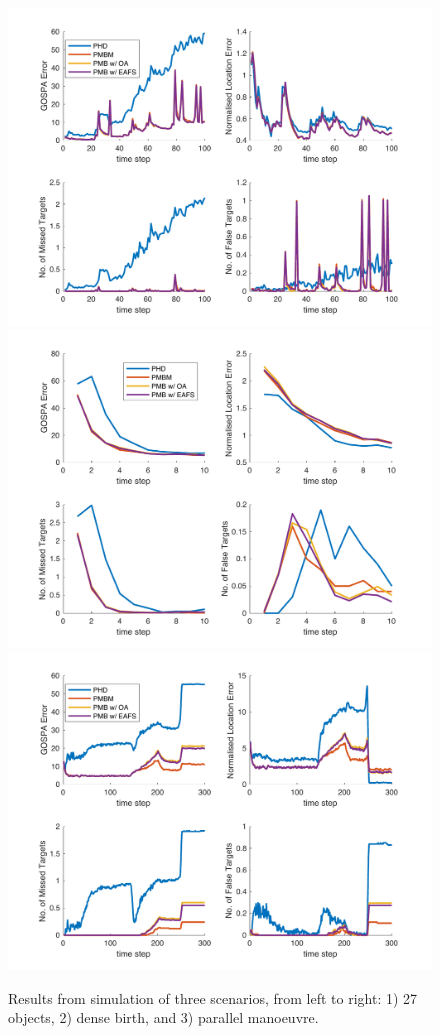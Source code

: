 \documentclass[conference]{IEEEtran}
\begin{document}
\begin{figure}[!t]
	\centering\includegraphics[width = 0.67\columnwidth]{GOSPA27Targets}
	\hspace{-2mm}
	\includegraphics[width = 0.67\columnwidth]{GOSPAdenseBirth}
	\hspace{-2mm}
	\includegraphics[width = 0.67\columnwidth]{GOSPAparallelTurn}
	\caption{Results from simulation of three scenarios, from left to right: 1) 27 objects, 2) dense birth, and 3) parallel manoeuvre.}%
	\label{fig:SimulationResults}
\end{figure}
\end{document}
